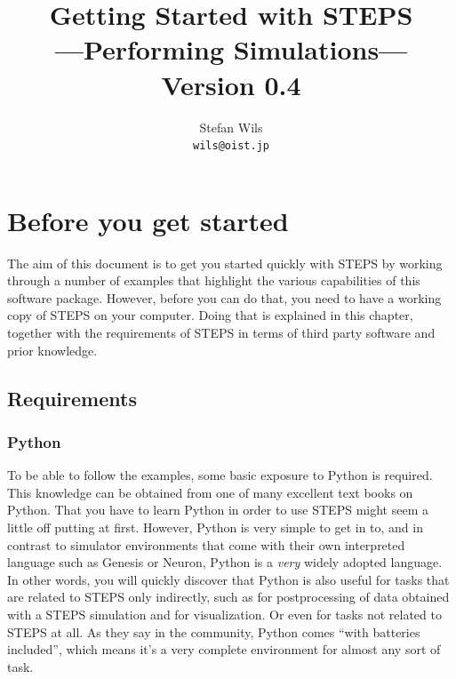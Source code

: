 \documentclass[a4paper,12pt]{book}
\newcommand{\stepsversion}[0]{0.4}
\begin{document}

\title{Getting Started with STEPS\\
---Performing Simulations---\\
Version \stepsversion}
\author{Stefan Wils\\
\texttt{wils@oist.jp}}
\maketitle

\tableofcontents

\chapter{Before you get started}

The aim of this document is to get you started quickly with STEPS by working through a number of examples that highlight the various capabilities of this software package. However, before you can do that, you need to have a working copy of STEPS on your computer. Doing that is explained in this chapter, together with the requirements of STEPS in terms of third party software and prior knowledge.

\section{Requirements}

\subsection{Python}

To be able to follow the examples, some basic exposure to Python is required. This knowledge can be obtained from one of many excellent text books on Python. That you have to learn Python in order to use STEPS might seem a little off putting at first. However, Python is very simple to get in to, and in contrast to simulator environments that come with their own interpreted language such as Genesis or Neuron, Python is a \emph{very} widely adopted language. In other words, you will quickly discover that Python is also useful for tasks that are related to STEPS only indirectly, such as for postprocessing of data obtained with a STEPS simulation and for visualization. Or even for tasks not related to STEPS at all. As they say in the community, Python comes ``with batteries included'', which means it's a very complete environment for almost any sort of task.
\end{document}
